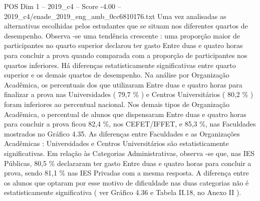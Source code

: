 \begin{textsample}{POS Dim 1 – 2019\_c4 – Score -4.00 – 2019\_c4/enade\_2019\_eng\_amb\_0cc6810176.txt}
Uma vez analisadas as alternativas escolhidas pelos estudantes que se situam nos diferentes quartos de desempenho.
Observa -se uma tendência crescente : uma proporção maior de participantes no quarto superior declarou ter gasto Entre duas e quatro horas para concluir a prova quando comparada com a proporção de participantes nos quartos inferiores.
Há diferenças estatisticamente significativas entre quarto superior e os demais quartos de desempenho.
Na análise por Organização Acadêmica, os percentuais dos que utilizaram Entre duas e quatro horas para finalizar a prova nas Universidades ( 79,7 \% ) e Centros Universitários ( 80,2 \% ) foram inferiores ao percentual nacional.
Nos demais tipos de Organização Acadêmica, o percentual de alunos que dispensaram Entre duas e quatro horas para concluir a prova ficou 82,4 \%, nos CEFET/IFFET, e 85,3 \%, nas Faculdades mostrados no Gráfico 4.35.
As diferenças entre Faculdades e as Organizações Acadêmicas : Universidades e Centros Universitários são estatisticamente significativas.
Em relação às Categorias Administrativas, observa -se que, nas IES Públicas, 80,5 \% declararam ter gasto Entre duas e quatro horas para concluir a prova, sendo 81,1 \% nas IES Privadas com a mesma resposta.
A diferença entre os alunos que optaram por esse motivo de dificuldade nas duas categorias não é estatisticamente significativa ( ver Gráfico 4.36 e Tabela II.18, no Anexo II ).

\end{textsample}
